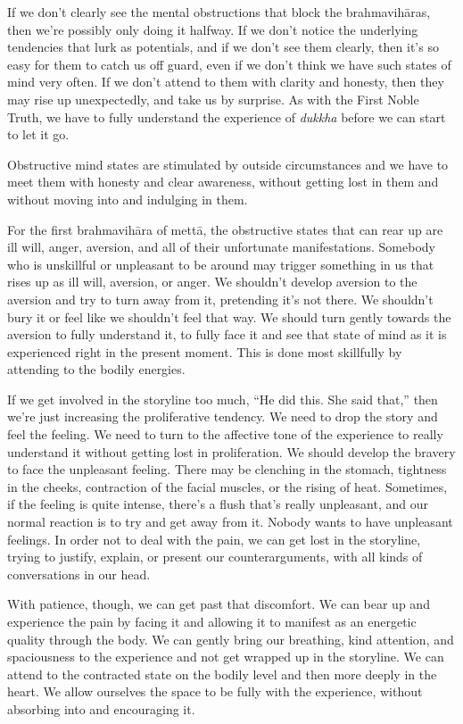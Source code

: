 If we don't clearly see the mental obstructions that block the brahmavihāras, then we're possibly only doing it halfway. If we don't notice the underlying tendencies that lurk as potentials, and if we don't see them clearly, then it's so easy for them to catch us off guard, even if we don't think we have such states of mind very often. If we don't attend to them with clarity and honesty, then they may rise up unexpectedly, and take us by surprise. As with the First Noble Truth, we have to fully understand the experience of \emph{dukkha} before we can start to let it go.

Obstructive mind states are stimulated by outside circumstances and we have to meet them with honesty and clear awareness, without getting lost in them and without moving into and indulging in them.

For the first brahmavihāra of mettā, the obstructive states that can rear up are ill will, anger, aversion, and all of their unfortunate manifestations. Somebody who is unskillful or unpleasant to be around may trigger something in us that rises up as ill will, aversion, or anger. We shouldn't develop aversion to the aversion and try to turn away from it, pretending it's not there. We shouldn't bury it or feel like we shouldn't feel that way. We should turn gently towards the aversion to fully understand it, to fully face it and see that state of mind as it is experienced right in the present moment. This is done most skillfully by attending to the bodily energies.

If we get involved in the storyline too much, ``He did this. She said that,'' then we're just increasing the proliferative tendency. We need to drop the story and feel the feeling. We need to turn to the affective tone of the experience to really understand it without getting lost in proliferation. We should develop the bravery to face the unpleasant feeling. There may be clenching in the stomach, tightness in the cheeks, contraction of the facial muscles, or the rising of heat. Sometimes, if the feeling is quite intense, there's a flush that's really unpleasant, and our normal reaction is to try and get away from it. Nobody wants to have unpleasant feelings. In order not to deal with the pain, we can get lost in the storyline, trying to justify, explain, or present our counterarguments, with all kinds of conversations in our head.

With patience, though, we can get past that discomfort. We can bear up and experience the pain by facing it and allowing it to manifest as an energetic quality through the body. We can gently bring our breathing, kind attention, and spaciousness to the experience and not get wrapped up in the storyline. We can attend to the contracted state on the bodily level and then more deeply in the heart. We allow ourselves the space to be fully with the experience, without absorbing into and encouraging it.

